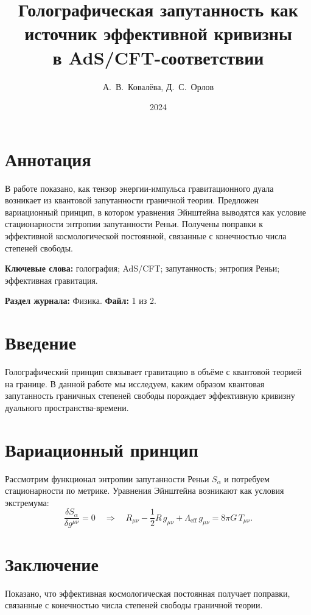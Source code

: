 \documentclass[12pt]{article}
\title{Голографическая запутанность как источник эффективной кривизны\\ в AdS/CFT-соответствии}
\author{А.~В.~Ковалёва, Д.~С.~Орлов}
\date{2024}
\begin{document}
\maketitle

\section*{Аннотация}
В работе показано, как тензор энергии-импульса гравитационного дуала возникает из квантовой запутанности граничной теории. Предложен вариационный принцип, в котором уравнения Эйнштейна выводятся как условие стационарности энтропии запутанности Реньи. Получены поправки к эффективной космологической постоянной, связанные с конечностью числа степеней свободы.

\vspace{0.5cm}
\noindent\textbf{Ключевые слова:} голография; AdS/CFT; запутанность; энтропия Реньи; эффективная гравитация.

\vspace{0.3cm}
\noindent\textbf{Раздел журнала:} Физика. \quad \textbf{Файл:} 1 из 2.

\section{Введение}
Голографический принцип связывает гравитацию в объёме с квантовой теорией на границе. В данной работе мы исследуем, каким образом квантовая запутанность граничных степеней свободы порождает эффективную кривизну дуального пространства-времени.

\section{Вариационный принцип}
Рассмотрим функционал энтропии запутанности Реньи $S_\alpha$ и потребуем стационарности по метрике. Уравнения Эйнштейна возникают как условия экстремума:
\begin{equation}
\frac{\delta S_\alpha}{\delta g^{\mu\nu}} = 0 \quad \Longrightarrow \quad R_{\mu\nu} - \frac{1}{2}R\,g_{\mu\nu} + \Lambda_{\text{eff}}\,g_{\mu\nu} = 8\pi G\,T_{\mu\nu}.
\end{equation}

\section{Заключение}
Показано, что эффективная космологическая постоянная получает поправки, связанные с конечностью числа степеней свободы граничной теории.
\end{document}
